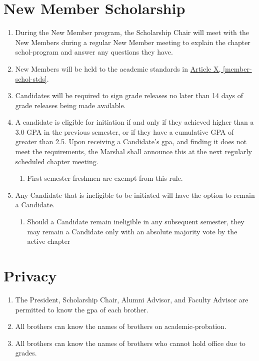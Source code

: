 \section{New Member Scholarship}
	\begin{enumerate}
		\item During the New Member program, the Scholarship Chair will meet with the New Members during a regular New Member meeting to explain the chapter \Gls{schol-program} and answer any questions they have.

		\item New Members will be held to the academic standards in \hyperref[member-schol-stds]{Article X, \autoref*{member-schol-stds}}.

		\item Candidates will be required to sign grade releases no later than 14 days of grade releases being made available.

		\item A candidate is eligible for initiation if and only if they achieved higher than a 3.0 GPA in the previous semester, or if they have a cumulative GPA of greater than 2.5. Upon receiving a Candidate's \gls{gpa}, and finding it does not meet the requirements, the Marshal shall announce this at the next regularly scheduled chapter meeting.

		\begin{enumerate}
			\item First semester freshmen are exempt from this rule.
		\end{enumerate}

		\item Any Candidate that is ineligible to be initiated will have the option to remain a Candidate.

		\begin{enumerate}
			\item Should a Candidate remain ineligible in any subsequent semester, they may remain a Candidate only with an absolute majority vote by the active chapter
		\end{enumerate}

	\end{enumerate}

\section{Privacy}
	\begin{enumerate}
		\item The President, Scholarship Chair, Alumni Advisor, and Faculty Advisor are permitted to know the \gls{gpa} of each brother.

		\item All brothers can know the names of brothers on \gls{academic-probation}.

		\item All brothers can know the names of brothers who cannot hold office due to grades.

	\end{enumerate}

